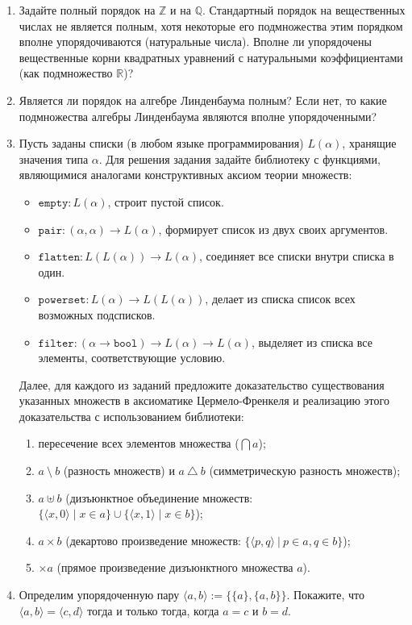 \documentclass[10pt,a4paper,oneside]{article}
\begin{document}
\begin{enumerate}
\item Задайте полный порядок на $\mathbb{Z}$ и на $\mathbb{Q}$. Стандартный порядок на вещественных числах не
является полным, хотя некоторые его подмножества этим порядком вполне упорядочиваются (натуральные числа).
Вполне ли упорядочены вещественные корни квадратных уравнений с натуральными коэффициентами (как подмножество $\mathbb{R}$)?
\item Является ли порядок на алгебре Линденбаума полным? Если нет, то какие подмножества алгебры Линденбаума
являются вполне упорядоченными?
\item Пусть заданы списки (в любом языке программирования) $L(\alpha)$, хранящие значения типа $\alpha$.
Для решения задания задайте библиотеку с функциями, являющимися аналогами конструктивных аксиом теории множеств:
\begin{itemize}
\item $\texttt{empty}: L(\alpha)$, строит пустой список.
\item $\texttt{pair}: (\alpha, \alpha) \rightarrow L(\alpha)$, формирует список из двух своих аргументов.
\item $\texttt{flatten}: L(L(\alpha)) \rightarrow L(\alpha)$, соединяет все списки внутри списка в один.
\item $\texttt{powerset}: L(\alpha) \rightarrow L(L(\alpha))$, делает из списка список всех возможных подсписков.
\item $\texttt{filter}: (\alpha \rightarrow \texttt{bool}) \rightarrow L(\alpha) \rightarrow L(\alpha)$,
выделяет из списка все элементы, соответствующие условию.
\end{itemize}
Далее, для каждого из заданий предложите доказательство существования указанных множеств в аксиоматике
Цермело-Френкеля и реализацию этого доказательства с использованием библиотеки:
\begin{enumerate}
\item пересечение всех элементов множества ($\bigcap a$);
\item $a\ \setminus\ b$ (разность множеств) и $a\ \triangle\ b$ (симметрическую разность множеств);
\item $a \uplus b$ (дизъюнктное объединение множеств: $\{\langle x,0\rangle\mid x\in a\}\cup\{\langle x,1\rangle\mid x\in b\}$);
\item $a \times b$ (декартово произведение множеств: $\{\langle p,q\rangle\ |\ p\in a, q\in b\}$);
\item $\times a$ (прямое произведение дизъюнктного множества $a$).
\end{enumerate}
\item Определим упорядоченную пару $\langle a,b\rangle := \{\{a\},\{a,b\}\}$. Покажите, что
$\langle a,b \rangle = \langle c,d\rangle$ тогда и только тогда, когда $a = c$ и $b = d$.


\end{enumerate}
\end{document}
